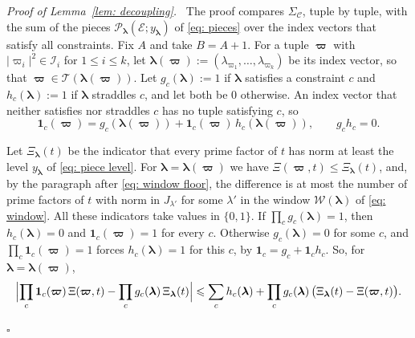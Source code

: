 \documentclass{article}
\numberwithin{equation}{section}
\newenvironment{proof}[1][Proof]{\par\medskip\noindent\textit{#1.}\ }{\hfill$\square$\par\medskip}
\newcommand{\Le}{\leqslant}
\begin{document}
\begin{proof}[Proof of Lemma~\ref{lem: decoupling}]
The proof compares $\Sigma_{\mathcal{C}}$, tuple by tuple, with the sum of the pieces $\mathcal{P}_{\boldsymbol{\lambda}}(\mathcal{E}; y_{\boldsymbol{\lambda}})$ of \eqref{eq: pieces} over the index vectors that satisfy all constraints. Fix $A$ and take $B = A + 1$. For a tuple $\boldsymbol{\varpi}$ with $|\varpi_i|^2 \in \mathcal{I}_i$ for $1 \Le i \Le k$, let $\boldsymbol{\lambda}(\boldsymbol{\varpi}) := (\lambda_{\varpi_1}, \dots, \lambda_{\varpi_k})$ be its index vector, so that $\boldsymbol{\varpi} \in \mathcal{T}(\boldsymbol{\lambda}(\boldsymbol{\varpi}))$. Let $g_c(\boldsymbol{\lambda}) := 1$ if $\boldsymbol{\lambda}$ satisfies a constraint $c$ and $h_c(\boldsymbol{\lambda}) := 1$ if $\boldsymbol{\lambda}$ straddles $c$, and let both be $0$ otherwise. An index vector that neither satisfies nor straddles $c$ has no tuple satisfying $c$, so
\begin{equation*}
\mathbf{1}_c(\boldsymbol{\varpi}) = g_c(\boldsymbol{\lambda}(\boldsymbol{\varpi})) + \mathbf{1}_c(\boldsymbol{\varpi})\, h_c(\boldsymbol{\lambda}(\boldsymbol{\varpi})), \qquad g_c h_c = 0.
\end{equation*}

Let $\Xi_{\boldsymbol{\lambda}}(t)$ be the indicator that every prime factor of $t$ has norm at least the level $y_{\boldsymbol{\lambda}}$ of \eqref{eq: piece level}. For $\boldsymbol{\lambda} = \boldsymbol{\lambda}(\boldsymbol{\varpi})$ we have $\Xi(\boldsymbol{\varpi}, t) \Le \Xi_{\boldsymbol{\lambda}}(t)$, and, by the paragraph after \eqref{eq: window floor}, the difference is at most the number of prime factors of $t$ with norm in $J_{\lambda'}$ for some $\lambda'$ in the window $\mathcal{W}(\boldsymbol{\lambda})$ of \eqref{eq: window}. All these indicators take values in $\{0, 1\}$. If $\prod_c g_c(\boldsymbol{\lambda}) = 1$, then $h_c(\boldsymbol{\lambda}) = 0$ and $\mathbf{1}_c(\boldsymbol{\varpi}) = 1$ for every $c$. Otherwise $g_c(\boldsymbol{\lambda}) = 0$ for some $c$, and $\prod_c \mathbf{1}_c(\boldsymbol{\varpi}) = 1$ forces $h_c(\boldsymbol{\lambda}) = 1$ for this $c$, by $\mathbf{1}_c = g_c + \mathbf{1}_c h_c$. So, for $\boldsymbol{\lambda} = \boldsymbol{\lambda}(\boldsymbol{\varpi})$,
\begin{equation}
\label{eq: decoupling pointwise}
\Bigl| \prod_c \mathbf{1}_c(\boldsymbol{\varpi})\, \Xi(\boldsymbol{\varpi}, t) - \prod_c g_c(\boldsymbol{\lambda})\, \Xi_{\boldsymbol{\lambda}}(t) \Bigr| \Le \sum_c h_c(\boldsymbol{\lambda}) + \prod_c g_c(\boldsymbol{\lambda})\, \bigl(\Xi_{\boldsymbol{\lambda}}(t) - \Xi(\boldsymbol{\varpi}, t)\bigr).
\end{equation}


\end{proof}
\end{document}
